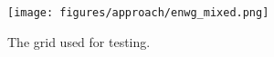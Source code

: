 \begin{figure}[h]
	\begin{centering}
		{\texttt{[image: figures/approach/enwg\_mixed.png]}}
		\caption{The grid used for testing.}
		\label{fig:enwg_mixed}
	\end{centering}
\end{figure}
